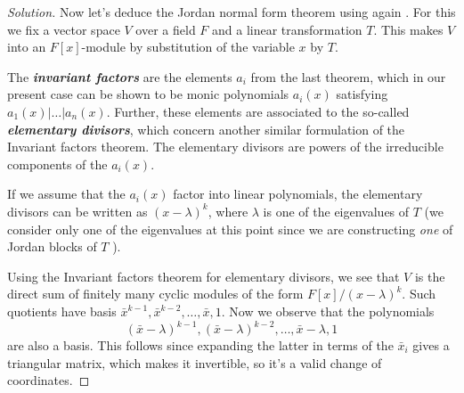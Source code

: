 \begin{proof}[Solution]
	Now let's deduce the Jordan normal form theorem using again  \cite{dummit}. For this we fix a vector space $V$ over a field $F$ and a linear transformation $T$. This  makes $V$ into an $F[x]$-module by substitution of the variable $x$ by $T$.

	The \textit{\textbf{invariant factors}} are the elements $a_i$ from the last theorem, which in our present case can be shown to be monic polynomials $a_i(x)$ satisfying $a_1(x)|\ldots|a_n(x)$. Further, these elements are associated to the so-called  \textit{\textbf{elementary divisors}}, which concern another similar formulation of the Invariant factors theorem. The elementary divisors are powers of the irreducible components of the $a_i(x)$.

	If we assume that the  $a_i(x)$ factor into linear polynomials, the elementary divisors can be written as $(x-\lambda)^k$, where $\lambda$ is one of the eigenvalues of $T$ (we consider only one of the eigenvalues at this point since we are constructing \textit{one} of Jordan blocks of $T$ ).

	Using the Invariant factors theorem for elementary divisors, we see that $V$ is the direct sum of finitely many cyclic modules of the form $F[x]/(x-\lambda)^k$. Such quotients have basis $\bar{x}^{k-1},\bar{x}^{k-2},\ldots,\bar{x},1$. Now we observe that the polynomials
	\[(\bar{x}-\lambda)^{k-1},(\bar{x}-\lambda)^{k-2},\ldots,\bar{x}-\lambda,1\]
are also a basis. This follows since expanding the latter in terms of the $\bar{x}_i$ gives a triangular matrix, which makes it invertible, so it's a valid change of coordinates.


\end{proof}
